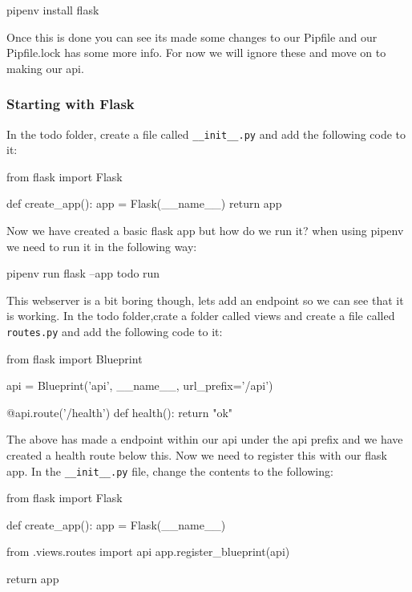 \documentclass{csse4400}
\begin{document}
\begin{code}[language=bash]{}
pipenv install flask
\end{code}

Once this is done you can see its made some changes to our Pipfile and our Pipfile.lock has some more info. For now we will ignore these and move on to making our api.

\subsubsection{Starting with Flask}

In the todo folder, create a file called \texttt{\_\_init\_\_.py} and add the following code to it:

\begin{code}[language=python]{}
from flask import Flask

def create_app():
    app = Flask(__name__)
    return app
\end{code}

Now we have created a basic flask app but how do we run it? when using pipenv we need to run it in the following way:

\begin{code}[language=bash]{}
pipenv run flask --app todo run
\end{code}

This webserver is a bit boring though, lets add an endpoint so we can see that it is working. In the todo folder,crate a folder called views and create a file called \texttt{routes.py} and add the following code to it:

\begin{code}[language=python]{}

from flask import Blueprint

api = Blueprint('api', __name__, url_prefix='/api')

@api.route('/health')
def health():
    return "ok"

\end{code}

The above has made a endpoint within our api under the api prefix and we have created a health route below this. Now we need to register this with our flask app. In the \texttt{\_\_init\_\_.py} file, change the contents to the following:

\begin{code}[language=python]{}
from flask import Flask

def create_app():
    app = Flask(__name__)
    
    from .views.routes import api
    app.register_blueprint(api)
    
    return app

\end{code}
\end{document}
